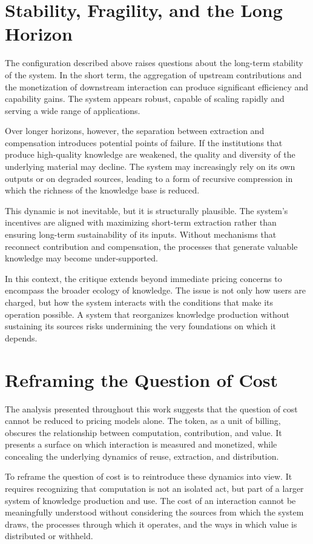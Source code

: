\documentclass[12pt, oneside]{article}
\begin{document}
\section{Stability, Fragility, and the Long Horizon}

The configuration described above raises questions about the long-term stability of the system. In the short term, the aggregation of upstream contributions and the monetization of downstream interaction can produce significant efficiency and capability gains. The system appears robust, capable of scaling rapidly and serving a wide range of applications.

Over longer horizons, however, the separation between extraction and compensation introduces potential points of failure. If the institutions that produce high-quality knowledge are weakened, the quality and diversity of the underlying material may decline. The system may increasingly rely on its own outputs or on degraded sources, leading to a form of recursive compression in which the richness of the knowledge base is reduced.

This dynamic is not inevitable, but it is structurally plausible. The system’s incentives are aligned with maximizing short-term extraction rather than ensuring long-term sustainability of its inputs. Without mechanisms that reconnect contribution and compensation, the processes that generate valuable knowledge may become under-supported.

In this context, the critique extends beyond immediate pricing concerns to encompass the broader ecology of knowledge. The issue is not only how users are charged, but how the system interacts with the conditions that make its operation possible. A system that reorganizes knowledge production without sustaining its sources risks undermining the very foundations on which it depends.

\section{Reframing the Question of Cost}

The analysis presented throughout this work suggests that the question of cost cannot be reduced to pricing models alone. The token, as a unit of billing, obscures the relationship between computation, contribution, and value. It presents a surface on which interaction is measured and monetized, while concealing the underlying dynamics of reuse, extraction, and distribution.

To reframe the question of cost is to reintroduce these dynamics into view. It requires recognizing that computation is not an isolated act, but part of a larger system of knowledge production and use. The cost of an interaction cannot be meaningfully understood without considering the sources from which the system draws, the processes through which it operates, and the ways in which value is distributed or withheld.
\end{document}
